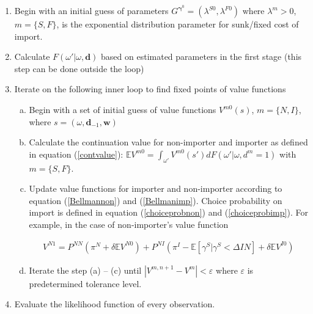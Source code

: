 \documentclass[11pt,letter]{article}
\newcommand{\vect}[1]{\boldsymbol{\mathbf{#1}}}
\newcommand{\epsi}{\varepsilon}
\newcommand{\prn}[1]{\left({#1}\right)}
\newcommand{\mprn}[1]{\{{#1}\}}
\newcommand{\lprn}[1]{\left[{#1}\right]}
\begin{document}
\begin{appendices}
\begin{enumerate}
    \item Begin with an initial guess of parameters $G^{\vect{\gamma}^0}=(\lambda^{S0},\lambda^{F0})$ where $\lambda^m > 0$, $m=\mprn{S,F}$, is the exponential distribution parameter for sunk/fixed cost of import.
    \item Calculate $F(\omega'|\omega,\vect{d})$ based on estimated parameters in the first stage (this step can be done outside the loop)
    \item Iterate on the following inner loop to find fixed points of value functions
    \begin{enumerate}[(a)]
        \item Begin with a set of initial guess of value functions $V^{m0}(s)$, $m=\mprn{N,I}$, where $s=(\omega, \vect{d}_{-1}, \vect{w})$
        \item Calculate the continuation value for non-importer and importer as defined in equation (\ref{contvalue}): $\mathbb{E}V^{m0}=\int_{\omega'}V^{m0}(s')dF(\omega'|\omega,d^m=1)$ with $m=\mprn{S,F}$.
	\item Update value functions for importer and non-importer according to equation (\ref{Bellmannon}) and (\ref{Bellmanimp}). Choice probability on import is defined in equation (\ref{choiceprobnon}) and (\ref{choiceprobimp}). For example, in the case of non-importer's value function

\begin{align*}
V^{N1} = P^{NN}\prn{\pi^N  + \delta \mathbb{E} V^{N0}} +  P^{NI}\prn{\pi^I -\mathbb{E}\lprn{\gamma^S|\gamma^S < \Delta IN} + \delta \mathbb{E} V^{I0}}
\end{align*}

\item Iterate the step (a) -- (c) until $|V^{m,n+1}-V^{m}|<\epsi$ where $\epsi$ is predetermined tolerance level.

    \end{enumerate}
\item Evaluate the likelihood function of every observation.
\end{enumerate}


\end{appendices}
\end{document}
